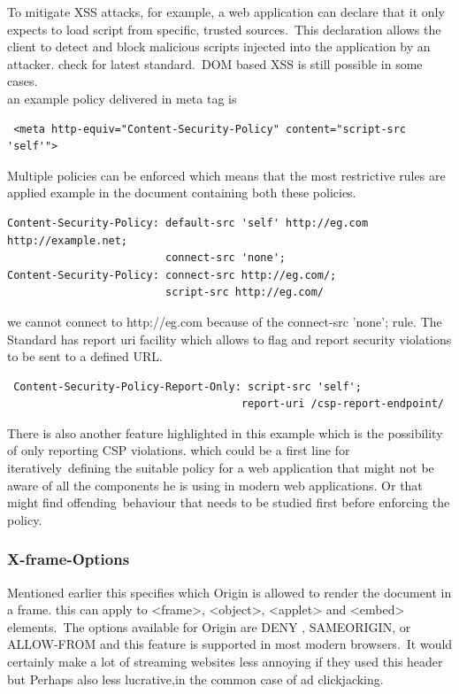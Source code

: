 \documentclass[a4paper,12pt]{paper}
\begin{document}
To mitigate XSS attacks, for example, a web application can declare that it only expects to load script from specific, trusted sources.\
This declaration allows the client to detect and block malicious scripts injected into the application by an attacker. check \cite{csp} for latest standard.\
DOM based XSS is still possible in some cases.\\

an example policy delivered in meta tag is 
\begin{verbatim}
 <meta http-equiv="Content-Security-Policy" content="script-src 'self'">
\end{verbatim}

Multiple policies can be enforced which means that the most restrictive rules are applied example in the document containing both these policies.\
\begin{verbatim}
Content-Security-Policy: default-src 'self' http://eg.com http://example.net;
                         connect-src 'none';
Content-Security-Policy: connect-src http://eg.com/;
                         script-src http://eg.com/
\end{verbatim}

we cannot connect to http://eg.com because of the connect-src 'none'; rule.
The Standard has report uri facility which allows to flag and report security violations to be sent to a defined URL.

\begin{verbatim}
 Content-Security-Policy-Report-Only: script-src 'self';
                                     report-uri /csp-report-endpoint/
\end{verbatim}

There is also another feature highlighted in this example which is the possibility of only reporting CSP violations. which could be a first line for iteratively\
defining the suitable policy for a web application that might not be aware of all the components he is using in modern web applications. Or that might find offending\
behaviour that needs to be studied first before enforcing the policy.\\


\subsubsection{X-frame-Options}
\label{X-frame-Options}
Mentioned earlier this specifies which Origin is allowed to render the document in a frame. this can apply to <frame>, <object>, <applet> and <embed> elements.\
The options available for Origin are DENY , SAMEORIGIN, or ALLOW-FROM and this feature is supported in most modern browsers.\
It would certainly make a lot of streaming websites less annoying if they used this header but Perhaps also less lucrative,in the common case of ad clickjacking.\
\end{document}
